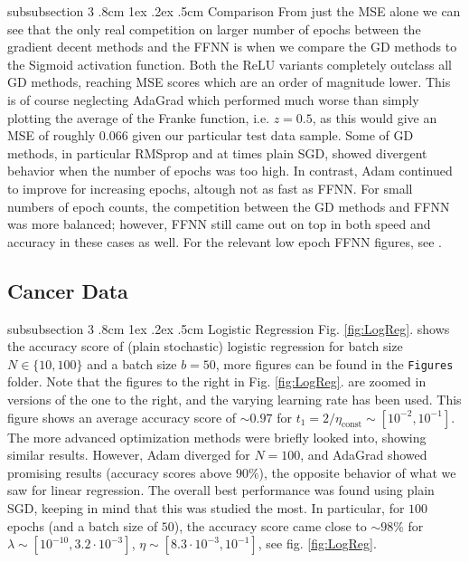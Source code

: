 \documentclass[%
reprint,s
amsmath,amssymb,
aps,
]{revtex4-2}
\makeatletter
\renewcommand{\subsubsection}{%
	\@startsection
	{subsubsection}%
	{3}%
	{\z@}%
	{.8cm \@plus1ex \@minus .2ex}%
	{.5cm}%
	{\normalfont\small\centering}%
}
\makeatother
\begin{document}
\subsubsection{Comparison}
From just the MSE alone we can see that the only real competition on larger number of epochs between the gradient decent methods and the FFNN is when we compare the GD methods to the Sigmoid activation function. Both the ReLU variants completely outclass all GD methods, reaching MSE scores which are an order of magnitude lower. This is of course neglecting AdaGrad which performed much worse than simply plotting the average of the Franke function, i.e. $z=0.5$, as this would give an MSE of roughly $0.066$ given our particular test data sample. Some of GD methods, in particular RMSprop and at times plain SGD, showed divergent behavior when the number of epochs was too high. In contrast, Adam continued to improve for increasing epochs, altough not as fast as FFNN. For small numbers of epoch counts, the competition between the GD methods and FFNN was more balanced; however, FFNN still came out on top in both speed and accuracy in these cases as well. For the relevant low epoch FFNN figures, see \cite{extrafigures}.

\subsection{Cancer Data}
\subsubsection{Logistic Regression} \label{sec:cancer_data_logisit_regression}
Fig. \ref{fig:LogReg}. shows the accuracy score of (plain stochastic) logistic regression for batch size \(N\in\{10, 100\}\) and a batch size \(b=50\), more figures can be found in the \texttt{Figures} folder. Note that the figures to the right in Fig. \ref{fig:LogReg}. are zoomed in versions of the one to the right, and the varying learning rate has been used. This figure shows an average accuracy score of \(\sim 0.97\) for \(t_1 = 2/\eta_{\text{const}} \sim[10^{-2}, 10^{-1}]\). The more advanced optimization methods were briefly looked into, showing similar results. However, Adam diverged for \(N=100\), and AdaGrad showed promising results (accuracy scores above \(90\%\)), the opposite behavior of what we saw for linear regression. The overall best performance was found using plain SGD, keeping in mind that this was studied the most. In particular, for \(100\) epochs (and a batch size of \(50\)), the accuracy score came close to \(\sim 98\%\) for \(\lambda\sim[10^{-10}, 3.2\cdot 10^{-3}]\), \(\eta\sim[8.3\cdot 10^{-3}, 10^{-1}]\), see fig. \ref{fig:LogReg}.
\end{document}
